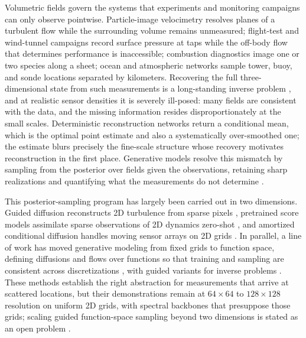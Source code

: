 \documentclass{article} %
\begin{document}
Volumetric fields govern the systems that experiments and monitoring campaigns can only observe pointwise. Particle-image velocimetry resolves planes of a turbulent flow while the surrounding volume remains unmeasured; flight-test and wind-tunnel campaigns record surface pressure at taps while the off-body flow that determines performance is inaccessible; combustion diagnostics image one or two species along a sheet; ocean and atmospheric networks sample tower, buoy, and sonde locations separated by kilometers. Recovering the full three-dimensional state from such measurements is a long-standing inverse problem \citep{callaham2019robust,raissi2020hidden,vinuesa2023transformative}, and at realistic sensor densities it is severely ill-posed: many fields are consistent with the data, and the missing information resides disproportionately at the small scales. Deterministic reconstruction networks \citep{fukami2021global,santos2023senseiver,dang2025flronet} return a conditional mean, which is the optimal point estimate and also a systematically over-smoothed one; the estimate blurs precisely the fine-scale structure whose recovery motivates reconstruction in the first place. Generative models resolve this mismatch by sampling from the posterior over fields given the observations, retaining sharp realizations and quantifying what the measurements do not determine \citep{shu2023physics,li2024s3gm,zhuang2025spatially}.

This posterior-sampling program has largely been carried out in two dimensions. Guided diffusion reconstructs 2D turbulence from sparse pixels \citep{shu2023physics,amoros2026guiding}, pretrained score models assimilate sparse observations of 2D dynamics zero-shot \citep{li2024s3gm,huang2024diffusionpde}, and amortized conditional diffusion handles moving sensor arrays on 2D grids \citep{zhuang2025spatially}. In parallel, a line of work has moved generative modeling from fixed grids to function space, defining diffusions and flows over functions so that training and sampling are consistent across discretizations \citep{kerrigan2024functional,lim2025score,pidstrigach2024infinite,shi2025stochastic}, with guided variants for inverse problems \citep{yao2025fundps,kerrigan2024dynamic}. These methods establish the right abstraction for measurements that arrive at scattered locations, but their demonstrations remain at $64\times64$ to $128\times128$ resolution on uniform 2D grids, with spectral backbones that presuppose those grids; scaling guided function-space sampling beyond two dimensions is stated as an open problem \citep{yao2025fundps}.
\end{document}
